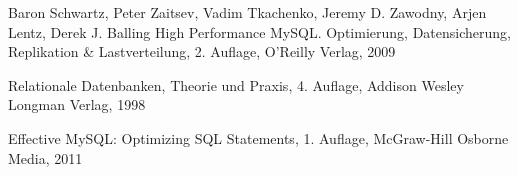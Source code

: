 \newpage
{}


  \begin{thebibliography}{}



     Baron Schwartz, Peter Zaitsev, Vadim Tkachenko, Jeremy D. Zawodny, Arjen Lentz, Derek J. Balling
     High Performance MySQL. Optimierung, Datensicherung, Replikation \& Lastverteilung, 2. Auflage,  O'Reilly Verlag, 2009

      Relationale Datenbanken, Theorie und Praxis, 4. Auflage, Addison Wesley Longman Verlag, 1998

     Effective MySQL: Optimizing SQL Statements, 1. Auflage, McGraw-Hill Osborne Media, 2011

  \end{thebibliography}


 